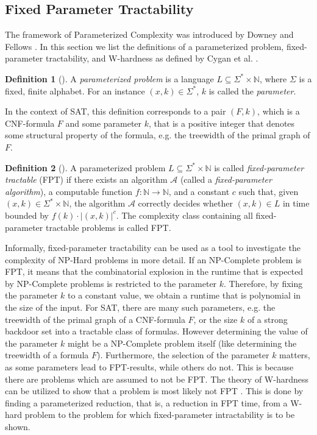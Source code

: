 \documentclass[11pt,a4paper]{article}
\theoremstyle{definition}
\newtheorem{definition}{Definition}[section]
\begin{document}

\subsection{Fixed Parameter Tractability}
The framework of Parameterized Complexity was introduced by Downey and Fellows \cite{} . In this section we list the definitions of a parameterized problem, fixed-parameter tractability, and W-hardness as defined by Cygan et al. \cite{}.
\begin{definition}[\cite{}] 
A \textit{parameterized problem} is a language $L \subseteq \Sigma^* \times \mathbb{N}$, where $\Sigma$ is a fixed, finite alphabet. For an instance $(x,k) \in \Sigma^*$, $k$ is called the \textit{parameter}.
\end{definition}
In the context of SAT, this definition corresponds to a pair $(F, k)$, which is a CNF-formula $F$ and some parameter $k$, that is a positive integer that denotes some structural property of the formula, e.g. the treewidth of the primal graph of $F$. 
\begin{definition}[\cite{}] 
A parameterized problem $L \subseteq \Sigma^* \times \mathbb{N}$ is called \textit{fixed-parameter tractable} (FPT) if there exists an algorithm $\mathcal{A}$ (called a \textit{fixed-parameter algorithm}), a computable function $f : \mathbb{N} \to \mathbb{N}$, and a constant $c$ such that, given $(x,k) \in \Sigma^* \times \mathbb{N}$, the algorithm $\mathcal{A}$ correctly decides whether $(x,k) \in L$ in time bounded by $f(k) \cdot |(x,k)|^c$. The complexity class containing all fixed-parameter tractable problems is called FPT. 
\end{definition}
Informally, fixed-parameter tractability can be used as a tool to investigate the complexity of NP-Hard problems in more detail. If an NP-Complete problem is FPT, it means that the combinatorial explosion in the runtime that is expected by NP-Complete problems is restricted to the parameter $k$. Therefore, by fixing the parameter $k$ to a constant value, we obtain a runtime that is polynomial in the size of the input. For SAT, there are many such parameters, e.g. the treewidth of the primal graph of a CNF-formula $F$, or the size $k$ of a strong backdoor set into a tractable class of formulas. However determining the value of the parameter $k$ might be a NP-Complete problem itself (like determining the treewidth of a formula $F$). Furthermore, the selection of the parameter $k$ matters, as some parameters lead to FPT-results, while others do not. This is because there are problems which are assumed to not be FPT. The theory of W-hardness can be utilized to show that a problem is most likely not FPT \cite{} . This is done by finding a parameterized reduction, that is, a reduction in FPT time, from a W-hard problem to the problem for which fixed-parameter intractability is to be shown. 
\end{document}
